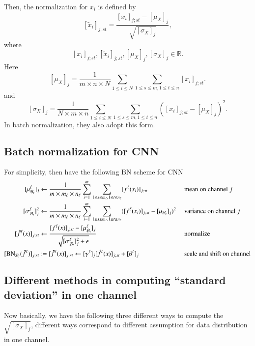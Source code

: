Then, the normalization for $x_i$ is defined by
\begin{equation}\label{key}
[\tilde x_i]_{{j;st}} = \frac{[x_i]_{{j;st}} - [\mu_X]_j }{\sqrt{[\sigma_X]_j}},
\end{equation}
where %
\begin{equation}\label{key}
[x_i]_{{j;st}}, [\tilde x_i]_{{j;st}}, [\mu_X]_j, [\sigma_X]_j \in \mathbb{R}.
\end{equation}
Here 
\begin{equation}\label{key}
[\mu_X]_j = \frac{1}{m\times n\times N} \sum_{ 1 \le i \le N} \sum_{1\le s \le m, 1 \le t \le n} [x_i]_{j;st}.
\end{equation}
and 
\begin{equation}\label{key}
[\sigma_X]_j = \frac{1}{ N \times m\times n} \sum_{ 1 \le i \le N} \sum_{1\le s \le m, 1 \le t \le n} ([x_i]_{j;st} -[\mu_X]_j )^2.
\end{equation}
In batch normalization, they also adopt this form.


\subsection{Batch normalization for CNN}
For simplicity, then have the following BN scheme for CNN
\begin{equation}\label{def:BNeq-traningCNN}
\begin{aligned}
[\mu^\ell_{\mathcal B_t}]_{j} & \leftarrow \frac{1}{m \times m_\ell \times n_\ell }\sum_{i=1}^m \sum_{1\le s\le m_\ell, 1\le t \le n_\ell} [f^\ell(x_i)]_{j;st}  &&\text{ mean on channel }j \\
[\sigma^\ell_{\mathcal B_t}]_{j}^2 & \leftarrow \frac{1}{m \times m_\ell \times n_\ell }\sum_{i=1}^m \sum_{1\le s\le m_\ell, 1\le t \le n_\ell} ([f^\ell(x_i)]_{j;st}-[\mu_{\mathcal B_t}]_j)^2   &&\text{ variance on channel }j\\
[\hat f^\ell (x)]_{j;st} & \leftarrow \frac{[f^\ell(x)]_{j,st}-[\mu^\ell_{\mathcal B_t}]_j}{\sqrt{[\sigma^\ell_{\mathcal B_t}]_j^2+\epsilon}}   &&\text{ normalize }\\
[{\rm BN}_{\mathcal B_t}(\tilde f^{\ell})]_{j;st} &:= [\tilde f^\ell(x)]_{j;st}  \leftarrow [\gamma^\ell]_j [\hat f^\ell (x)]_{j;st} + [\beta^\ell]_{j} 
&&\text{ scale and shift on channel}
\end{aligned}
\end{equation}


\subsection{Different methods in computing ``standard deviation'' in one channel}
Now basically, we have the following three different ways to 
compute the $\sqrt{[\sigma_X]_j}$, different ways correspond to different
assumption for data distribution in one channel.

